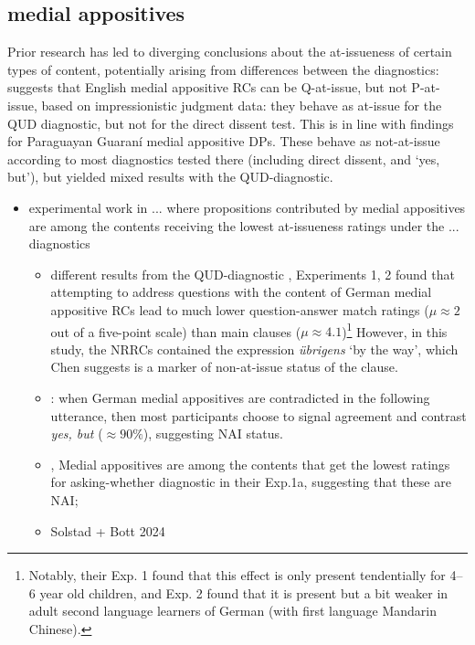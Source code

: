 \documentclass[times,linguex,xcolor]{glossa}
\begin{document}
  \subsection{medial appositives}
  Prior research has led to diverging conclusions about the at-issueness of certain types of content, potentially arising from differences between the diagnostics: \citealt{koev_notions_2018} suggests that English medial appositive RCs can be Q-at-issue, but not P-at-issue, based on impressionistic judgment data: they behave as at-issue for the QUD diagnostic, but not for the direct dissent test. This is in line with  findings for Paraguayan Guaraní medial appositive DPs.
  These behave as not-at-issue according to most diagnostics tested there (including direct dissent, and `yes, but'), but yielded mixed results with the QUD-diagnostic.
  \begin{itemize}
    \item experimental work in ... where propositions contributed by medial appositives are among the contents receiving the lowest at-issueness ratings under the ... diagnostics

    \begin{itemize}
      \item different results from the QUD-diagnostic \citealt{chen_presuppositions_2024}, Experiments 1, 2 found that attempting to address questions with the content of German medial appositive RCs lead to much lower question-answer match ratings ($\mu \approx 2$ out of a five-point scale) than main clauses ($\mu \approx 4.1$)\footnote{Notably, their Exp. 1 found that this effect is only present tendentially for 4--6 year old children, and Exp. 2 found that it is present but a bit weaker in adult second language learners of German (with first language Mandarin Chinese).}
      However, in this study, the NRRCs contained the expression \emph{übrigens} \lq by the way\rq, which Chen suggests is a marker of non-at-issue status of the clause.

      \item \citealt{destruel_cross-linguistic_2015}: when German medial appositives are contradicted in the following utterance, then most participants choose to signal agreement and contrast \emph{yes, but} ($\approx 90\%$), suggesting NAI status.

      \item \citealt{tonhauser_how_2018}, Medial appositives are among the contents that get the lowest ratings for asking-whether diagnostic in their Exp.1a, suggesting that these are NAI; 

      \item Solstad + Bott 2024
    \end{itemize}

  \end{itemize}
\end{document}

